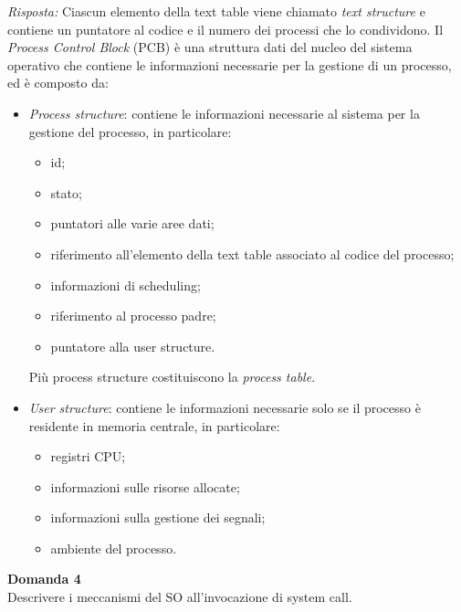 \documentclass{article}
\newenvironment{problem}[2][Domanda]
    { \begin{mdframed}[backgroundcolor=gray!20] \textbf{#1 #2} \\}
    {  \end{mdframed}}
\newenvironment{solution}
    {\textit{Risposta:}}
    {}
\begin{document}
\begin{solution}
Ciascun elemento della text table viene chiamato \textit{text structure} e contiene un puntatore al codice e il numero dei processi che lo condividono.
\newline
\newline
Il \textit{Process Control Block} (PCB) è una struttura dati del nucleo del sistema operativo che contiene le informazioni necessarie per la gestione di un processo, ed è composto da:
\begin{itemize}
    \item \emph{Process structure}: contiene le informazioni necessarie al sistema per la gestione del processo, in particolare:
    \begin{itemize}
        \item id;
        \item stato;
        \item puntatori alle varie aree dati;
        \item riferimento all'elemento della text table associato al codice del processo;
        \item informazioni di scheduling;
        \item riferimento al processo padre;
        \item puntatore alla user structure.
    \end{itemize}
    Più process structure costituiscono la \textit{process table}.
    \item \emph{User structure}: contiene le informazioni necessarie solo se il processo è residente in memoria centrale, in particolare:
    \begin{itemize}
        \item registri CPU;
        \item informazioni sulle risorse allocate;
        \item informazioni sulla gestione dei segnali;
        \item ambiente del processo.
    \end{itemize}
\end{itemize}
\end{solution}
\begin{problem}{4}
Descrivere i meccanismi del SO all’invocazione di system call.
\end{problem}
\end{document}
